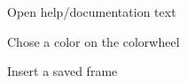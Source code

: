 \documentclass[11pt]{article} %
\begin{document}
\begin{figure}[H]
	\centering
	\caption{Open help/documentation text}
	\label{fig:UC11}
\end{figure}

\begin{figure}[H]
	\centering
	\caption{Chose a color on the colorwheel}
	\label{fig:UC12}
\end{figure}

\begin{figure}[H]
	\centering
	\caption{Insert a saved frame}
	\label{fig:UC13}
\end{figure}
\end{document}
